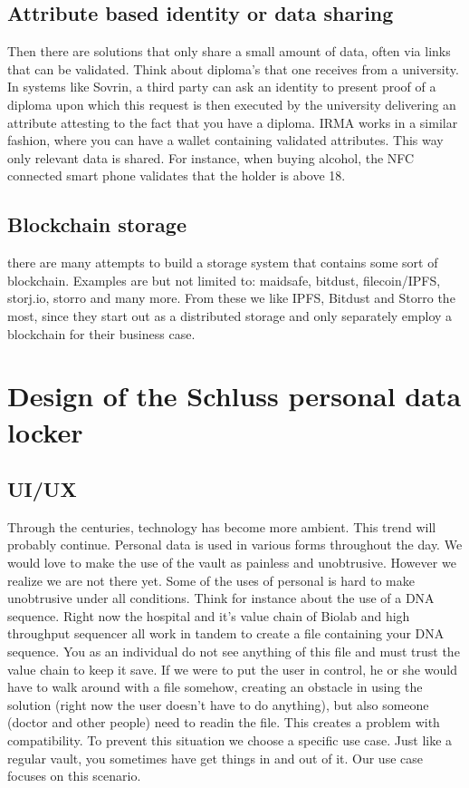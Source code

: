 \documentclass{article}
\begin{document}
\subsection{Attribute based identity or data sharing}
Then there are solutions that only share a small amount of data, often via links that can be validated. Think about diploma's that one receives from a university. In systems like Sovrin, a third party can ask an identity to present proof of a diploma upon which this request is then executed by the university delivering an attribute attesting to the fact that you have a diploma. IRMA works in a similar fashion, where you can have a wallet containing validated attributes. This way only relevant data is shared. For instance, when buying alcohol, the NFC connected smart phone validates that the holder is above 18.

\subsection{Blockchain storage}
there are many attempts to build a storage system that contains some sort of blockchain. Examples are but not limited to: maidsafe, bitdust, filecoin/IPFS, storj.io, storro and many more. From these we like IPFS, Bitdust and Storro the most, since they start out as a distributed storage and only separately employ a blockchain for their business case.

\section{Design of the Schluss personal data locker}
\subsection{UI/UX}
Through the centuries, technology has become more ambient. This trend will probably continue. Personal data is used in various forms throughout the day. We would love to make the use of the vault as painless and unobtrusive. However we realize we are not there yet. Some of the uses of personal is hard to make unobtrusive under all conditions. Think for instance about the use of a DNA sequence. Right now the hospital and it's value chain of Biolab and high throughput sequencer all work in tandem to create a file containing your DNA sequence. You as an individual do not see anything of this file and must trust the value chain to keep it save. If we were to put the user in control, he or she would have to walk around with a file somehow, creating an obstacle in using the solution (right now the user doesn't have to do anything), but also someone (doctor and other people) need to readin the file. This creates a problem with compatibility. To prevent this situation we choose a specific use case. Just like a regular vault, you sometimes have get things in and out of it. Our use case focuses on this scenario.
\end{document}
